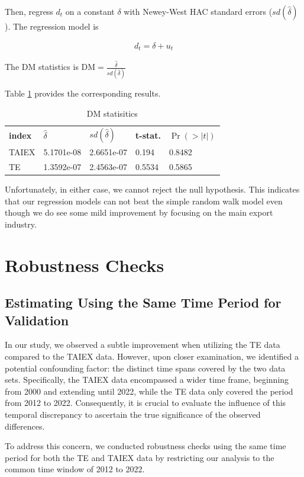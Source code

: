 \documentclass[]{AEA}
\begin{document}
\begin{spacing}{2.0}
Then, regress $d_t$ on a constant $\delta$ with Newey-West HAC standard errors ($sd(\hat \delta)$). The regression model is 

\begin{align}
d_t=\delta +u_t
\end{align}

The DM statistics is $\text{DM}=\frac{\hat \delta}{sd(\hat \delta)}$

Table \ref{t7} provides the corresponding results.

\begin{table}
\caption{DM statisitics}
\label{t7}
\begin{tabular}{lllll}
\textbf{index} & \textbf{$\hat \delta$} & \textbf{$sd(\hat \delta)$} & \textbf{t-stat.} & \textbf{$\Pr(>|t|)$} \\
TAIEX & 5.1701e-08 &  2.6651e-07 & 0.194 & 0.8482 \\
TE & 1.3592e-07  & 2.4563e-07 & 0.5534 & 0.5865 \\
\end{tabular}
\end{table}

Unfortunately, in either case, we cannot reject the null hypothesis. This indicates that our regression models can not beat the simple random walk model even though we do see some mild improvement by focusing on the main export industry. 

\section{Robustness Checks}

\subsection{Estimating Using the Same Time Period for Validation}

In our study, we observed a subtle improvement when utilizing the TE data compared to the TAIEX data. However, upon closer examination, we identified a potential confounding factor: the distinct time spans covered by the two data sets. Specifically, the TAIEX data encompassed a wider time frame, beginning from 2000 and extending until 2022, while the TE data only covered the period from 2012 to 2022. Consequently, it is crucial to evaluate the influence of this temporal discrepancy to ascertain the true significance of the observed differences.

To address this concern, we conducted robustness checks using the same time period for both the TE and TAIEX data by restricting our analysis to the common time window of 2012 to 2022.


\end{spacing}
\end{document}
